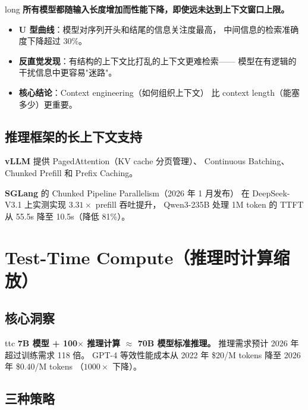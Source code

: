 \documentclass[
  customlatinfont = macos,
]{hkustthesis}
\begin{document}
\begin{insightbox}{long}
\textbf{所有模型都随输入长度增加而性能下降，即使远未达到上下文窗口上限。}
\begin{itemize}[noitemsep]
  \item \textbf{U 型曲线}：模型对序列开头和结尾的信息关注度最高，
        中间信息的检索准确度下降超过 30\%。
  \item \textbf{反直觉发现}：有结构的上下文比打乱的上下文更难检索——
        模型在有逻辑的干扰信息中更容易"迷路"。
  \item \textbf{核心结论}：Context engineering（如何组织上下文）
        比 context length（能塞多少）更重要。
\end{itemize}
\end{insightbox}

\section{推理框架的长上下文支持}

\textbf{vLLM} 提供 PagedAttention（KV cache 分页管理）、
Continuous Batching、Chunked Prefill 和 Prefix Caching。

\textbf{SGLang} 的 Chunked Pipeline Parallelism（2026 年 1 月发布）
在 DeepSeek-V3.1 上实测实现 $3.31\times$ prefill 吞吐提升，
Qwen3-235B 处理 1M token 的 TTFT 从 55.5s 降至 10.5s（降低 81\%）。


\chapter{Test-Time Compute（推理时计算缩放）}
\label{ch:ttc}

\section{核心洞察}

\begin{insightbox}[推理时计算的颠覆性影响]{ttc}
\textbf{7B 模型 + 100$\times$ 推理计算 $\approx$ 70B 模型标准推理。}
推理需求预计 2026 年超过训练需求 118 倍。
GPT-4 等效性能成本从 2022 年 \$20/M tokens 降至 2026 年 \$0.40/M tokens
（$1000\times$ 下降）。
\end{insightbox}

\section{三种策略}
\end{document}
